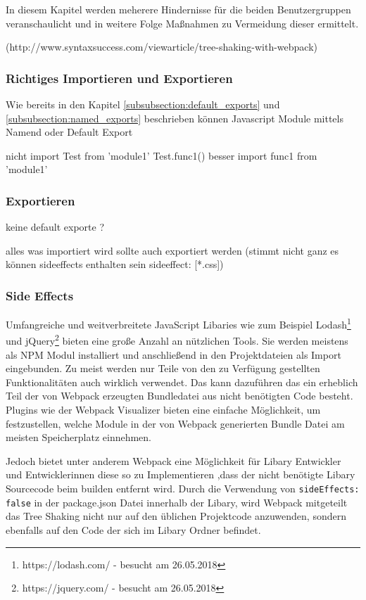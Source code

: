 In diesem Kapitel werden meherere Hindernisse für die beiden Benutzergruppen veranschaulicht und in weitere Folge Maßnahmen zu Vermeidung dieser ermittelt. 

(http://www.syntaxsuccess.com/viewarticle/tree-shaking-with-webpack)

\subsubsection{Richtiges Importieren und Exportieren}

Wie bereits in den Kapitel \ref{subsubsection:default_exports} und \ref{subsubsection:named_exports} beschrieben können Javascript Module mittels Namend oder Default Export

nicht
	import Test from 'module1'
    Test.func1()
besser 
	import {func1} from 'module1'

\subsubsection{Exportieren}
keine default exporte ?

alles was importiert wird sollte auch exportiert werden (stimmt nicht ganz es können sideeffects enthalten sein sideeffect: [*.css])

\subsubsection{Side Effects}
\label{subsubsection:side_effects}
Umfangreiche und weitverbreitete JavaScript Libaries wie zum Beispiel Lodash\footnote{https://lodash.com/ - besucht am 26.05.2018} und jQuery\footnote{https://jquery.com/ - besucht am 26.05.2018} bieten eine große Anzahl an nützlichen Tools. Sie werden meistens als NPM Modul installiert und anschließend in den Projektdateien als Import eingebunden. Zu meist werden nur Teile von den zu Verfügung gestellten Funktionalitäten auch wirklich verwendet. Das kann dazuführen das ein erheblich Teil der von Webpack erzeugten Bundledatei aus nicht benötigten Code besteht. Plugins wie der Webpack Visualizer bieten eine einfache Möglichkeit, um festzustellen, welche Module in der von Webpack generierten Bundle Datei am meisten Speicherplatz einnehmen.

Jedoch bietet unter anderem Webpack eine Möglichkeit für Libary Entwickler und Entwicklerinnen diese so zu Implementieren ,dass der nicht benötigte Libary Sourcecode beim builden entfernt wird.
Durch die Verwendung von \lstinline{sideEffects: false} in der package.json Datei innerhalb der Libary, wird Webpack mitgeteilt das Tree Shaking nicht nur auf den üblichen Projektcode anzuwenden, sondern ebenfalls auf den Code der sich im Libary Ordner befindet.

